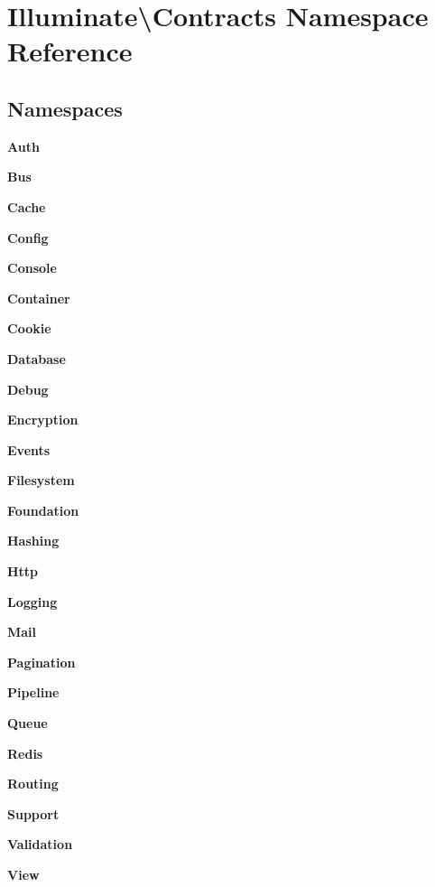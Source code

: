 \section{Illuminate\textbackslash{}Contracts Namespace Reference}
\label{namespace_illuminate_1_1_contracts}
\subsection*{Namespaces}
\begin{DoxyCompactItemize}
\item 
 {\bf Auth}
\item 
 {\bf Bus}
\item 
 {\bf Cache}
\item 
 {\bf Config}
\item 
 {\bf Console}
\item 
 {\bf Container}
\item 
 {\bf Cookie}
\item 
 {\bf Database}
\item 
 {\bf Debug}
\item 
 {\bf Encryption}
\item 
 {\bf Events}
\item 
 {\bf Filesystem}
\item 
 {\bf Foundation}
\item 
 {\bf Hashing}
\item 
 {\bf Http}
\item 
 {\bf Logging}
\item 
 {\bf Mail}
\item 
 {\bf Pagination}
\item 
 {\bf Pipeline}
\item 
 {\bf Queue}
\item 
 {\bf Redis}
\item 
 {\bf Routing}
\item 
 {\bf Support}
\item 
 {\bf Validation}
\item 
 {\bf View}
\end{DoxyCompactItemize}
